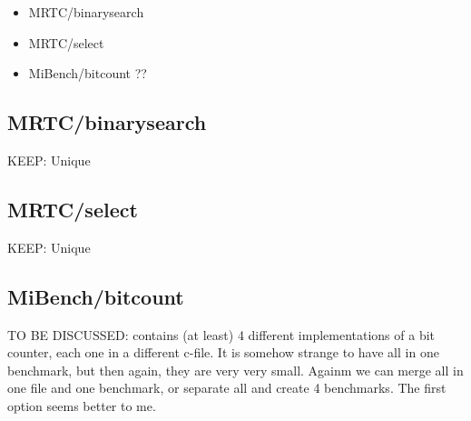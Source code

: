 \documentclass[a4paper]{article}
\begin{document}
\begin{itemize}
	\item  MRTC/binarysearch
	\item  MRTC/select
	\item  MiBench/bitcount ??
\end{itemize}

\subsection{MRTC/binarysearch}
	KEEP: Unique
\subsection{MRTC/select}
	KEEP: Unique
\subsection{MiBench/bitcount}
	TO BE DISCUSSED: contains (at least) 4 different implementations of a bit counter, each one in a different c-file. It is somehow strange to have all in one benchmark, but then again, they are very very small. Againm we can merge all in one file and one benchmark, or separate all and create 4 benchmarks. The first option seems better to me.

    
\end{document}
